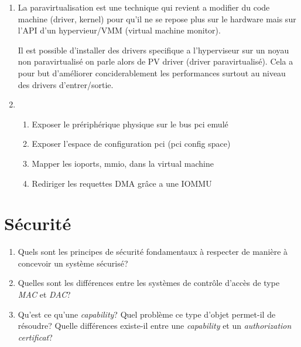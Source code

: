\begin{correction}

\begin{enumerate}
  \item
        La paravirtualisation est une technique qui revient a modifier du code
        machine (driver, kernel) pour qu'il ne se repose plus sur le hardware
        mais sur l'API d'un hypervieur/VMM (virtual machine monitor).

        Il est possible d'installer des drivers specifique a l'hyperviseur sur
        un noyau non paravirtualis\'e on parle alors de PV driver (driver
        paravirtualis\'e). Cela a pour but d'am\'eliorer conciderablement les
        performances surtout au niveau des drivers d'entrer/sortie.
  \item
       \begin{enumerate}
       \item Exposer le pr\'eriph\'erique physique sur le bus pci emul\'e
       \item Exposer l'espace de configuration pci (pci config space)
       \item Mapper les ioports, mmio, dans la virtual machine
       \item Rediriger les requettes DMA gr\^ace a une IOMMU
       \end{enumerate}
\end{enumerate}

\end{correction}

% 
%

\section{S\'ecurit\'e
         }

\begin{enumerate}
  \item
    Quels sont les principes de s\'ecurit\'e fondamentaux \`a respecter
    de mani\`ere \`a concevoir un syst\`eme s\'ecuris\'e?
  \item
    Quelles sont les diff\'erences entre les syst\`emes de contr\^ole d'acc\`es
    de type \textit{MAC} et \textit{DAC}?
  \item
    Qu'est ce qu'une \textit{capability}? Quel probl\`eme ce type d'objet
    permet-il de r\'esoudre? Quelle diff\'erences existe-il entre une
    \textit{capability} et un \textit{authorization certificat}?
\end{enumerate}

